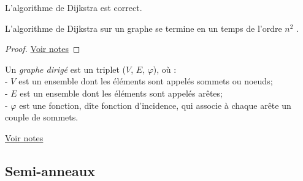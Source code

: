 \begin{mycorr} 
  L’algorithme de Dijkstra est correct.
\end{mycorr}

\begin{mytheo} 
  L’algorithme de Dijkstra sur un graphe se termine en un temps de l’ordre $n^2$ .
  \begin{proof}
     \href{https://dl.dropboxusercontent.com/u/44092863/Graph_Theory_Romain_Capron.pdf}{Voir notes}
  \end{proof}
\end{mytheo}

\begin{mydef}
  Un \emph{graphe dirigé} est un triplet ($V$, $E$, $\varphi$), où :\\
  - $V$ est un ensemble dont les éléments sont appelés sommets ou noeuds; \\
  - $E$ est un ensemble dont les éléments sont appelés arêtes; \\
  - $\varphi$ est une fonction, dîte fonction d'incidence, qui associe à chaque arête un couple de sommets. \\
\end{mydef}

\begin{myexem}
  \href{https://dl.dropboxusercontent.com/u/44092863/Graph_Theory_Romain_Capron.pdf}{Voir notes}
\end{myexem}

\subsection{Semi-anneaux}

